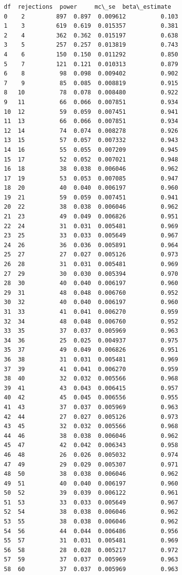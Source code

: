 \documentclass[11pt]{article}
\begin{document}
    
    \begin{Verbatim}[commandchars=\\\{\}]
    df  rejections  power     mc\_se  beta\_estimate
0    2         897  0.897  0.009612          0.103
1    3         619  0.619  0.015357          0.381
2    4         362  0.362  0.015197          0.638
3    5         257  0.257  0.013819          0.743
4    6         150  0.150  0.011292          0.850
5    7         121  0.121  0.010313          0.879
6    8          98  0.098  0.009402          0.902
7    9          85  0.085  0.008819          0.915
8   10          78  0.078  0.008480          0.922
9   11          66  0.066  0.007851          0.934
10  12          59  0.059  0.007451          0.941
11  13          66  0.066  0.007851          0.934
12  14          74  0.074  0.008278          0.926
13  15          57  0.057  0.007332          0.943
14  16          55  0.055  0.007209          0.945
15  17          52  0.052  0.007021          0.948
16  18          38  0.038  0.006046          0.962
17  19          53  0.053  0.007085          0.947
18  20          40  0.040  0.006197          0.960
19  21          59  0.059  0.007451          0.941
20  22          38  0.038  0.006046          0.962
21  23          49  0.049  0.006826          0.951
22  24          31  0.031  0.005481          0.969
23  25          33  0.033  0.005649          0.967
24  26          36  0.036  0.005891          0.964
25  27          27  0.027  0.005126          0.973
26  28          31  0.031  0.005481          0.969
27  29          30  0.030  0.005394          0.970
28  30          40  0.040  0.006197          0.960
29  31          48  0.048  0.006760          0.952
30  32          40  0.040  0.006197          0.960
31  33          41  0.041  0.006270          0.959
32  34          48  0.048  0.006760          0.952
33  35          37  0.037  0.005969          0.963
34  36          25  0.025  0.004937          0.975
35  37          49  0.049  0.006826          0.951
36  38          31  0.031  0.005481          0.969
37  39          41  0.041  0.006270          0.959
38  40          32  0.032  0.005566          0.968
39  41          43  0.043  0.006415          0.957
40  42          45  0.045  0.006556          0.955
41  43          37  0.037  0.005969          0.963
42  44          27  0.027  0.005126          0.973
43  45          32  0.032  0.005566          0.968
44  46          38  0.038  0.006046          0.962
45  47          42  0.042  0.006343          0.958
46  48          26  0.026  0.005032          0.974
47  49          29  0.029  0.005307          0.971
48  50          38  0.038  0.006046          0.962
49  51          40  0.040  0.006197          0.960
50  52          39  0.039  0.006122          0.961
51  53          33  0.033  0.005649          0.967
52  54          38  0.038  0.006046          0.962
53  55          38  0.038  0.006046          0.962
54  56          44  0.044  0.006486          0.956
55  57          31  0.031  0.005481          0.969
56  58          28  0.028  0.005217          0.972
57  59          37  0.037  0.005969          0.963
58  60          37  0.037  0.005969          0.963
    \end{Verbatim}
\end{document}
